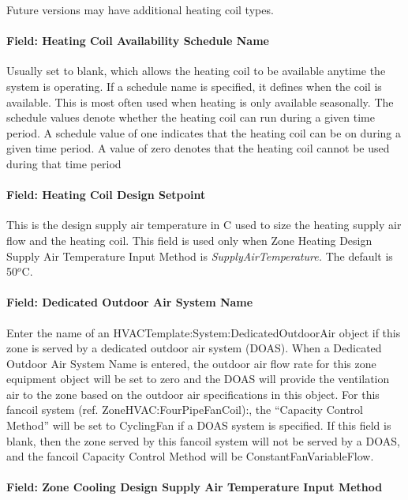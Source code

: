 Future versions may have additional heating coil types.

\paragraph{Field: Heating Coil Availability Schedule Name}\label{field-heating-coil-availability-schedule-name}

Usually set to blank, which allows the heating coil to be available anytime the system is operating. If a schedule name is specified, it defines when the coil is available. This is most often used when heating is only available seasonally. The schedule values denote whether the heating coil can run during a given time period. A schedule value of one indicates that the heating coil can be on during a given time period. A value of zero denotes that the heating coil cannot be used during that time period

\paragraph{Field: Heating Coil Design Setpoint}\label{field-heating-coil-design-setpoint}

This is the design supply air temperature in C used to size the heating supply air flow and the heating coil. This field is used only when Zone Heating Design Supply Air Temperature Input Method is \emph{SupplyAirTemperature.} The default is 50\(^{o}\)C.

\paragraph{Field: Dedicated Outdoor Air System Name}\label{field-dedicated-outdoor-air-system-name-1}

Enter the name of an HVACTemplate:System:DedicatedOutdoorAir object if this zone is served by a dedicated outdoor air system (DOAS). When a Dedicated Outdoor Air System Name is entered, the outdoor air flow rate for this zone equipment object will be set to zero and the DOAS will provide the ventilation air to the zone based on the outdoor air specifications in this object. For this fancoil system (ref. ZoneHVAC:FourPipeFanCoil):, the ``Capacity Control Method'' will be set to CyclingFan if a DOAS system is specified. If this field is blank, then the zone served by this fancoil system will not be served by a DOAS, and the fancoil Capacity Control Method will be ConstantFanVariableFlow.

\paragraph{Field: Zone Cooling Design Supply Air Temperature Input Method}\label{field-zone-cooling-design-supply-air-temperature-input-method-000}

